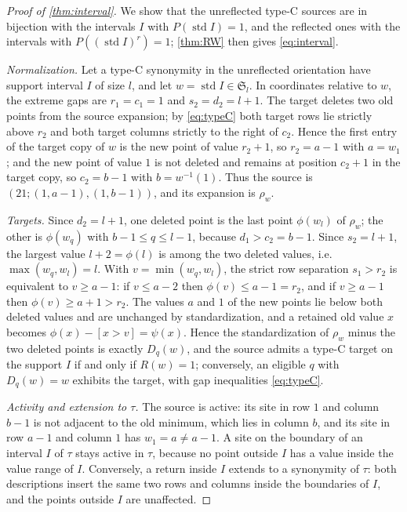 \documentclass[11pt,reqno]{amsart}
\theoremstyle{plain}
\theoremstyle{definition}
\theoremstyle{remark}
\newcommand{\std}{\operatorname{std}}
\newcommand{\Sym}{\mathfrak{S}}
\begin{document}
\begin{proof}[Proof of \cref{thm:interval}]
We show that the unreflected type-C sources are in bijection with the intervals $I$ with $P(\std I)=1$, and the reflected ones with the intervals with $P((\std I)^r)=1$; \cref{thm:RW} then gives \eqref{eq:interval}.

\emph{Normalization.} Let a type-C synonymity in the unreflected orientation have support interval $I$ of size $l$, and let $w=\std I\in\Sym_l$. In coordinates relative to $w$, the extreme gaps are $r_1=c_1=1$ and $s_2=d_2=l+1$. The target deletes two old points from the source expansion; by \eqref{eq:typeC} both target rows lie strictly above $r_2$ and both target columns strictly to the right of $c_2$. Hence the first entry of the target copy of $w$ is the new point of value $r_2+1$, so $r_2=a-1$ with $a=w_1$; and the new point of value $1$ is not deleted and remains at position $c_2+1$ in the target copy, so $c_2=b-1$ with $b=w^{-1}(1)$. Thus the source is $(21;(1,a-1),(1,b-1))$, and its expansion is $\rho_w$.

\emph{Targets.} Since $d_2=l+1$, one deleted point is the last point $\phi(w_l)$ of $\rho_w$; the other is $\phi(w_q)$ with $b-1\le q\le l-1$, because $d_1>c_2=b-1$. Since $s_2=l+1$, the largest value $l+2=\phi(l)$ is among the two deleted values, i.e. $\max(w_q,w_l)=l$. With $v=\min(w_q,w_l)$, the strict row separation $s_1>r_2$ is equivalent to $v\ge a-1$: if $v\le a-2$ then $\phi(v)\le a-1=r_2$, and if $v\ge a-1$ then $\phi(v)\ge a+1>r_2$. The values $a$ and $1$ of the new points lie below both deleted values and are unchanged by standardization, and a retained old value $x$ becomes $\phi(x)-[x>v]=\psi(x)$. Hence the standardization of $\rho_w$ minus the two deleted points is exactly $D_q(w)$, and the source admits a type-C target on the support $I$ if and only if $R(w)=1$; conversely, an eligible $q$ with $D_q(w)=w$ exhibits the target, with gap inequalities \eqref{eq:typeC}.

\emph{Activity and extension to $\tau$.} The source is active: its site in row $1$ and column $b-1$ is not adjacent to the old minimum, which lies in column $b$, and its site in row $a-1$ and column $1$ has $w_1=a\ne a-1$. A site on the boundary of an interval $I$ of $\tau$ stays active in $\tau$, because no point outside $I$ has a value inside the value range of $I$. Conversely, a return inside $I$ extends to a synonymity of $\tau$: both descriptions insert the same two rows and columns inside the boundaries of $I$, and the points outside $I$ are unaffected.


\end{proof}
\end{document}
